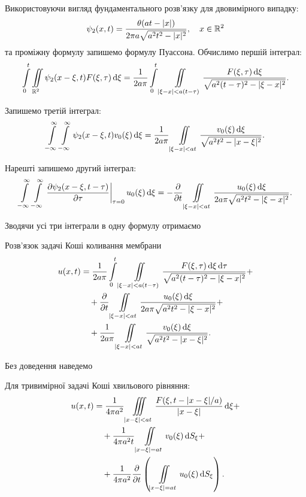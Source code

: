 Використовуючи вигляд фундаментального розв'язку для двовимірного випадку:
\begin{equation}
	\psi_2(x, t) = \frac{\theta(a t - |x|)}	{2 \pi a \sqrt{a^2 t^2 - |x|^2}}, \quad x \in \mathbb{R}^2
\end{equation}
та проміжну формулу запишемо формулу Пуассона. Обчислимо першій інтеграл:
\begin{equation}
	\displaystyle\int\limits_0^t \displaystyle\iint\limits_{\mathbb{R}^2} \psi_2(x - \xi, t) F(\xi, \tau) \mathop{}\!\mathrm{d} \xi = \frac{1}{2 a \pi}	\displaystyle\int\limits_0^t \displaystyle\iint\limits_{|\xi - x| < a (t - \tau)} \frac{F(\xi, \tau) \mathop{}\!\mathrm{d} \xi}{\sqrt{a^2 (t - \tau)^2 - |\xi - x|^2}}.
\end{equation}

Запишемо третій інтеграл:
\begin{equation}
	\displaystyle\int\limits_{-\infty}^\infty \displaystyle\int\limits_{-\infty}^\infty \psi_2(x - \xi, t) v_0(\xi) \mathop{}\!\mathrm{d} \xi = \frac{1}{2 a \pi} \displaystyle\iint\limits_{|\xi - x| < a t} \frac{v_0(\xi) \mathop{}\!\mathrm{d} \xi}{\sqrt{a^2 t^2 - |x - \xi|^2}}.
\end{equation}

Нарешті запишемо другий інтеграл:
\begin{equation}
	\displaystyle\int\limits_{-\infty}^\infty \displaystyle\int\limits_{-\infty}^\infty \left. \frac{\partial \psi_2(x - \xi, t - \tau)}{\partial \tau} \right|_{\tau = 0} u_0(\xi) \mathop{}\!\mathrm{d} \xi = - \frac{\partial}{\partial t} \displaystyle\iint\limits_{|\xi - x| < a t} \frac{u_0(\xi) \mathop{}\!\mathrm{d} \xi}{2 a \pi \sqrt{a^2 t^2 - |\xi - x|^2}}.
\end{equation}

Зводячи усі три інтеграли в одну формулу отримаємо
\begin{th_formula}[Пуассона]
	Розв'язок задачі Коші коливання мембрани
	\begin{equation}
		\begin{aligned}
			u(x, t) &= \frac{1}{2 a \pi} \displaystyle\int\limits_0^t \displaystyle\iint\limits_{|\xi - x| < a (t - \tau)} \frac{F(\xi, \tau) \mathop{}\!\mathrm{d} \xi \mathop{}\!\mathrm{d} \tau}{\sqrt{a^2 (t - \tau)^2 - |\xi - x|^2}} + \\
			& \quad + \frac{\partial}{\partial t} \displaystyle\iint\limits_{|\xi - x| < a t} \frac{u_0(\xi) \mathop{}\!\mathrm{d} \xi}{2 a \pi \sqrt{a^2 t^2 - |\xi - x|^2}} + \\
			& \quad + \frac{1}{2 a \pi} \displaystyle\iint\limits_{|\xi - x| < a t} \frac{v_0(\xi) \mathop{}\!\mathrm{d} \xi}{\sqrt{a^2 t^2 - |x - \xi|^2}}.
		\end{aligned}
	\end{equation}
\end{th_formula}

Без доведення наведемо 
\begin{th_formula}[Кіргофа]
	Для тривимірної задачі Коші хвильового рівняння:
	\begin{equation}
		\begin{aligned}
			u(x, t) &= \frac{1}{4 \pi a^2} \displaystyle\iiint\limits_{|x - \xi| < a t} \frac{F(\xi, t - |x - \xi| / a)}{|x - \xi|} \mathop{}\!\mathrm{d} \xi + \\
			& \quad + \frac{1}{4 \pi a^2 t} \displaystyle\iint\limits_{|x - \xi| = a t} v_0(\xi) \mathop{}\!\mathrm{d} S_\xi + \\
			& \quad + \frac{1}{4 \pi a^2} \frac{\partial}{\partial t} \left( \displaystyle\iint\limits_{|x - \xi| = a t} u_0(\xi) \mathop{}\!\mathrm{d} S_\xi \right).
		\end{aligned}
	\end{equation}
\end{th_formula}

